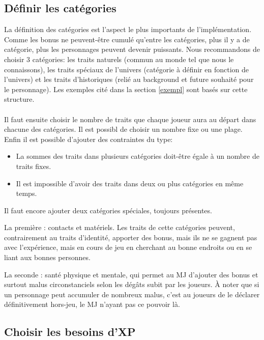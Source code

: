 \documentclass[a4paper,10pt,twoside,twocolumn]{article}
\begin{document}
 \subsection{Définir les catégories}
 \label{implem::cat}
 
 La définition des catégories est l'aspect le plus importants de l'implémentation. Comme les bonus ne peuvent-être cumulé qu'entre les catégories, plus il y a de catégorie, plus les personnages peuvent devenir puissants. Nous recommandons de choisir 3 catégories: les traits naturels (commun au monde tel que nous le connaissons), les traits spéciaux de l'univers (catégorie à définir en fonction de l'univers) et les traits d'historiques (relié au background et future souhaité pour le personnage). Les exemples cité dans la section \ref{exempl} sont basés sur cette structure.\\
 \\
 Il faut ensuite choisir le nombre de traits que chaque joueur aura au départ dans chacune des catégories. Il est possibl de choisir un nombre fixe ou une plage. Enfin il est possible d'ajouter des contraintes du type:
 
 \begin{itemize}
  \item La sommes des traits dans plusieurs catégories doit-être égale à un nombre de traits fixes.
  \item Il est impossible d'avoir des traits dans deux ou plus catégories en même temps.
 \end{itemize}

 Il faut encore ajouter deux catégories spéciales, toujours présentes.
 
 La première : contacts et matériels. Les traits de cette catégories peuvent, contrairement au traits d'identité, apporter des bonus, mais ils ne se gagnent pas avec l'expérience, mais en cours de jeu en cherchant au bonne endroits ou en se liant aux bonnes personnes.
 
 La seconde : santé physique et mentale, qui permet au MJ d'ajouter des bonus et surtout malus circonstanciels selon les dégâts subit par les joueurs. À noter que si un personnage peut accumuler de nombreux malus, c'est au joueurs de le déclarer définitivement hors-jeu, le MJ n'ayant pas ce pouvoir là.
 
 \subsection{Choisir les besoins d'XP}
 \label{implem::cat}
 
\end{document}
